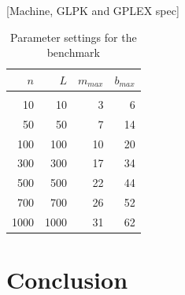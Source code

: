 \documentclass{article}
\begin{document}
[Machine, GLPK and GPLEX spec]

\begin{table}
	\caption{Parameter settings for the benchmark}\label{tab:settings}
	\begin{center}
	\begin{tabular}{ r r r r }
		$n$&$L$&$m_{max}$&$b_{max}$\\
		\hline\\
		10&	10&	3&	6 \\ 
		50&	50&	7&	14\\
		100&100&10&20\\
		300&300&17&34\\
		500&500&22&44\\
		700&700&26&52\\
		1000&1000&31&62
	\end{tabular}
	\end{center}
\end{table}


\section{Conclusion}

\end{document}
